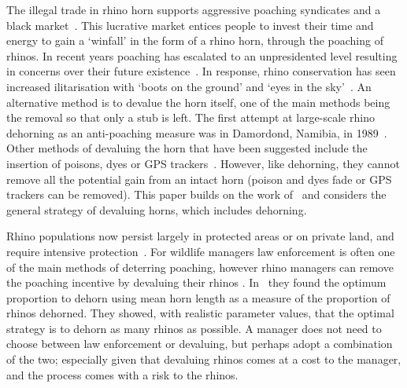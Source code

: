 \documentclass[10pt]{article}
\begin{document}
The illegal trade in rhino horn supports aggressive poaching syndicates and a 
black market~\cite{Nowell1992}. This lucrative market entices people to invest
their time and energy to gain a `winfall' in the form of a rhino horn, through the 
poaching of rhinos. In recent years poaching has escalated to an unpresidented 
level resulting in concerns over their future existence~\cite{Smith1993}. In 
response, rhino conservation has seen increased  ilitarisation with `boots on the 
ground' and `eyes in the sky'~\cite{duffy_st}. An alternative method is to 
devalue the horn itself, one of the main  methods being the removal so that only
a stub is left. The first attempt at large-scale rhino dehorning as an anti-poaching
measure was in Damordond,  Namibia, in 1989~\cite{Milner1992}. Other methods
of devaluing the horn that have been suggested include
the insertion of poisons, dyes or GPS trackers~\cite{Gill2010,Smith1993}. However, 
like dehorning, they cannot remove all the potential gain from an intact horn 
(poison and dyes fade or GPS trackers can be removed). This paper builds on 
the work of~\cite{Lee} and considers the general strategy of devaluing horns,
which includes dehorning.

Rhino populations now persist largely in protected areas or on private land, and
require intensive protection~\cite{Ferreira2014}. For wildlife managers law 
enforcement is often one of the main methods of deterring poaching, however 
rhino managers can remove the poaching incentive by devaluing their rhinos 
\cite{Milner1992}. In~\cite{Milner1992} they found the 
optimum proportion to dehorn using mean horn length as a measure of the 
proportion of rhinos dehorned. They showed, with realistic parameter values, 
that the optimal strategy is to dehorn as many rhinos as possible. 
A manager does not need to choose between law enforcement or devaluing, but
perhaps adopt a combination of the two; especially given that devaluing rhinos 
comes at a cost to the manager, and the process comes with a risk to the rhinos.
\end{document}

